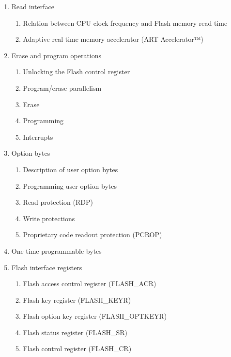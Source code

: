 \documentclass{article}
\begin{document}
\begin{enumerate}
\begin{enumerate}
        \item Read interface 
        \begin{enumerate}
            \item Relation between CPU clock frequency and Flash memory read time 
            \item Adaptive real-time memory accelerator (ART Accelerator™) 
        \end{enumerate}
        \item Erase and program operations 
        \begin{enumerate}
            \item Unlocking the Flash control register 
            \item Program/erase parallelism 
            \item Erase 
            \item Programming 
            \item Interrupts 
        \end{enumerate}
        \item Option bytes 
        \begin{enumerate}
            \item Description of user option bytes 
            \item Programming user option bytes 
            \item Read protection (RDP) 
            \item Write protections 
            \item Proprietary code readout protection (PCROP) 
        \end{enumerate}
        \item One-time programmable bytes 
        \item Flash interface registers 
        \begin{enumerate}
            \item Flash access control register (FLASH\_ACR) 
            \item Flash key register (FLASH\_KEYR) 
            \item Flash option key register (FLASH\_OPTKEYR) 
            \item Flash status register (FLASH\_SR) 
            \item Flash control register (FLASH\_CR) 

\end{enumerate}
\end{enumerate}
\end{enumerate}
\end{document}
